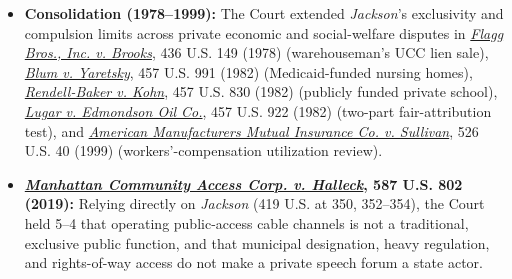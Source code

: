 \documentclass[12pt]{article}
\begin{document}
\begin{itemize}

\item \textbf{Consolidation (1978--1999):} The Court extended \emph{Jackson}'s exclusivity and compulsion limits across private economic and social-welfare disputes in \href{https://supreme.justia.com/cases/federal/us/436/149/}{\emph{Flagg Bros., Inc. v. Brooks}}, 436 U.S. 149 (1978) (warehouseman's UCC lien sale), \href{https://supreme.justia.com/cases/federal/us/457/991/}{\emph{Blum v. Yaretsky}}, 457 U.S. 991 (1982) (Medicaid-funded nursing homes), \href{https://supreme.justia.com/cases/federal/us/457/830/}{\emph{Rendell-Baker v. Kohn}}, 457 U.S. 830 (1982) (publicly funded private school), \href{https://www.law.cornell.edu/supremecourt/text/457/922}{\emph{Lugar v. Edmondson Oil Co.}}, 457 U.S. 922 (1982) (two-part fair-attribution test), and \href{https://www.law.cornell.edu/supremecourt/text/526/40}{\emph{American Manufacturers Mutual Insurance Co. v. Sullivan}}, 526 U.S. 40 (1999) (workers'-compensation utilization review).

\item \textbf{\href{https://www.law.cornell.edu/supremecourt/text/17-1702}{\emph{Manhattan Community Access Corp. v. Halleck}}, 587 U.S. 802 (2019):} Relying directly on \emph{Jackson} (419 U.S. at 350, 352--354), the Court held 5--4 that operating public-access cable channels is not a traditional, exclusive public function, and that municipal designation, heavy regulation, and rights-of-way access do not make a private speech forum a state actor.

\end{itemize}
\end{document}
